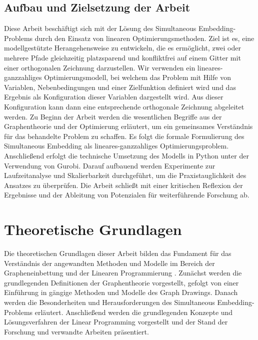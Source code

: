 \documentclass[bachelor, german]{algothesis}
\begin{document}
\section{Aufbau und Zielsetzung der Arbeit}
Diese Arbeit beschäftigt sich mit der Lösung des Simultaneous Embedding-Problems durch den Einsatz von linearen Optimierungsmethoden. Ziel ist es, eine modellgestützte Herangehensweise zu entwickeln, die es ermöglicht, zwei oder mehrere Pfade gleichzeitig platzsparend und konfliktfrei auf einem Gitter mit einer orthogonalen Zeichnung darzustellen. Wir verwenden ein lineares-ganzzahliges Optimierungsmodell, bei welchem das Problem mit Hilfe von Variablen, Nebenbedingungen und einer Zielfunktion definiert wird und das Ergebnis als Konfiguration dieser Variablen dargestellt wird. Aus dieser Konfiguration kann dann eine entsprechende orthogonale Zeichnung abgeleitet werden. \newline
Zu Beginn der Arbeit werden die wesentlichen Begriffe aus der Graphentheorie und der Optimierung erläutert, um ein gemeinsames Verständnis für das behandelte Problem zu schaffen. Es folgt die formale Formulierung des Simultaneous Embedding als lineares-ganzzahliges Optimierungsproblem. Anschließend erfolgt die technische Umsetzung des Modells in Python unter der Verwendung von Gurobi. Darauf aufbauend werden Experimente zur Laufzeitanalyse und Skalierbarkeit durchgeführt, um die Praxistauglichkeit des Ansatzes zu überprüfen. Die Arbeit schließt mit einer kritischen Reflexion der Ergebnisse und der Ableitung von Potenzialen für weiterführende Forschung ab.


\chapter{Theoretische Grundlagen}
Die theoretischen Grundlagen dieser Arbeit bilden das Fundament für das Verständnis der angewandten Methoden und Modelle im Bereich der Grapheneinbettung und der Linearen Programmierung . Zunächst werden die grundlegenden Definitionen der Graphentheorie vorgestellt, gefolgt von einer Einführung in gängige Methoden und Modelle des Graph Drawings. Danach werden die Besonderheiten und Herausforderungen des Simultaneous Embedding-Problems erläutert. Anschließend werden die grundlegenden Konzepte und Lösungsverfahren der Linear Programming vorgestellt und der Stand der Forschung und verwandte Arbeiten präsentiert.
\end{document}
